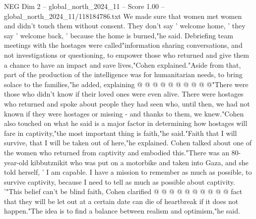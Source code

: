 \begin{textsample}{NEG Dim 2 – global\_north\_2024\_11 – Score 1.00 – global\_north\_2024\_11/118184786.txt}
We made sure that women met women and didn't touch them without consent.
They don't say ' welcome home, ' they say ' welcome back, ' because the home is burned,"he said.
Debriefing team meetings with the hostages were called"information sharing conversations, and not investigations or questioning, to empower those who returned and give them a chance to have an impact and save lives,"Cohen explained."Aside from that, part of the production of the intelligence was for humanitarian needs, to bring solace to the families,"he added, explaining @ @ @ @ @ @ @ @ @ @"There were those who didn't know if their loved ones were even alive.
There were hostages who returned and spoke about people they had seen who, until then, we had not known if they were hostages or missing - and thanks to them, we knew."Cohen also touched on what he said is a major factor in determining how hostages will fare in captivity,"the most important thing is faith,"he said."Faith that I will survive, that I will be taken out of here,"he explained.
Cohen talked about one of the women who returned from captivity and embodied this."There was an 80-year-old kibbutznikit who was put on a motorbike and taken into Gaza, and she told herself, ' I am capable.
I have a mission to remember as much as possible, to survive captivity, because I need to tell as much as possible about captivity. '"This belief can't be blind faith, Cohen clarified @ @ @ @ @ @ @ @ @ @ fact that they will be let out at a certain date can die of heartbreak if it does not happen."The idea is to find a balance between realism and optimism,"he said.

\end{textsample}
